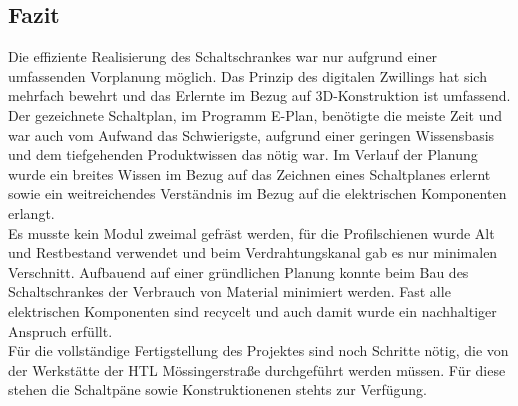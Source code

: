 \subsection{Fazit}
    Die effiziente Realisierung des Schaltschrankes war nur aufgrund einer umfassenden Vorplanung möglich. Das Prinzip des digitalen Zwillings hat sich mehrfach bewehrt und das Erlernte im Bezug auf 3D-Konstruktion ist umfassend.\\
    Der gezeichnete Schaltplan, im Programm E-Plan, benötigte die meiste Zeit und war auch vom Aufwand das Schwierigste, aufgrund einer geringen Wissensbasis und dem tiefgehenden Produktwissen das nötig war. Im Verlauf der Planung wurde ein breites Wissen im Bezug auf das Zeichnen eines Schaltplanes erlernt sowie ein weitreichendes Verständnis im Bezug auf die elektrischen Komponenten erlangt.\\
    Es musste kein Modul zweimal gefräst werden, für die Profilschienen wurde Alt und Restbestand verwendet und beim Verdrahtungskanal gab es nur minimalen Verschnitt. Aufbauend auf einer gründlichen Planung konnte beim Bau des Schaltschrankes der Verbrauch von Material minimiert werden. Fast alle elektrischen Komponenten sind recycelt und auch damit wurde ein nachhaltiger Anspruch erfüllt.\\
    Für die vollständige Fertigstellung des Projektes sind noch Schritte nötig, die von der Werkstätte der HTL Mössingerstraße durchgeführt werden müssen. Für diese stehen die Schaltpäne sowie Konstruktionenen stehts zur Verfügung.\\ 


